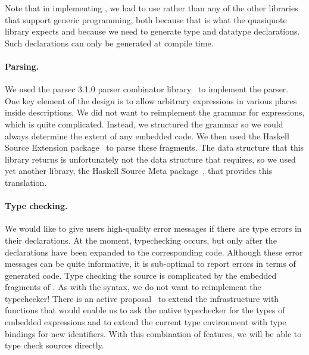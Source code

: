 Note that in implementing \forest{}, we had to use \template{}
rather than any of the other libraries that support generic programming,
both because that is what the quasiquote library expects and
because we need to generate type and datatype declarations.  Such
declarations can only be generated at compile time.

\paragraph{Parsing.}  
We used the parsec 3.1.0 parser
combinator library~\cite{LeijenMeijer:parsec} to implement the \forest{} parser.  One key element
of the \forest{} design is to allow arbitrary \haskell{} expressions
in various places inside \forest{} descriptions.  We did not want to
reimplement the grammar for \haskell{} expressions, which is quite
complicated.  Instead, we structured the \forest{} grammar so we could
always determine the extent of any embedded \haskell{} code.  We then
used the Haskell Source Extension package~\cite{haskell-src-exts} to parse
these fragments.  The data structure that this library returns is
unfortunately not the data structure that \template{} requires, so we
used yet another library, the Haskell Source Meta
package~\cite{haskell-src-meta}, that provides this translation. 


\paragraph{Type checking.}
We would like to give users high-quality error messages if there
are type errors in their \forest{} declarations.  At the moment, 
typechecking occurs, but only after the \forest{} declarations have
been expanded to the corresponding \haskell{} code.  Although these
error messages can be quite informative, it is sub-optimal to report
errors in terms of generated code.  Type checking the \forest{} source
is complicated by the embedded fragments of \haskell{}.  As with the
syntax, we do not want to reimplement the \haskell{} typechecker!  
There is an active proposal~\cite{extend-templates} to extend the \template{} infrastructure
with functions that would enable us to ask the native \haskell{}
typechecker for the types of embedded expressions and to extend the
current type environment with type bindings for new identifiers.  With
this combination of features, we will be able to type check \forest{}
sources directly.

